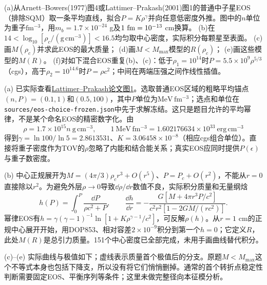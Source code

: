\begin{exercise}
(a)从Arnett--Bowers(1977)图4或Lattimer--Prakash(2001)图1的普通中子星EOS（排除SQM）取一条平均直线，拟合$P=K\rho^\gamma$并向任意低密度外推。图中的$n$单位为重子$\mathrm{fm^{-3}}$，用$m_b=1.7\times10^{-24}$ g及$1\ {\rm fm}=10^{-13}$ cm换算。
(b)在$14<\log_{10}[\rho_c/(\mathrm{g\,cm^{-3}})]<16.5$均匀取中心密度，实际积分每颗星至表面。
(c)画$M(\rho_c)$并求此EOS的最大质量；
(d)画$M<M_{\max}$模型的$R(\rho_c)$；
(e)画这些模型的$M(R)$。
(f)对如下混合EOS重复(b)、(c)：低于$\rho_1=10^{14}$时$P=5.5\times10^9\rho^{5/3}$（cgs），高于$\rho_2=10^{14.6}$时$P=\rho c^2$；中间在两端压强之间作线性插值。
\end{exercise}
\begin{solution}
(a) 已实际查看\href{https://arxiv.org/abs/astro-ph/0002232}{Lattimer--Prakash论文图1}。选取普通EOS区域的粗略平均锚点$(n,P)=(0.1,1)$和$(0.5,100)$，其中$P$单位为$\mathrm{MeV\,fm^{-3}}$；选点和单位在\texttt{sources/eos-choice-frozen.json}中先于求解冻结。这只是题目允许的平均幂律，不是某个命名EOS的精密数字化。由
\[
 \rho=1.7\times10^{15}n\ \mathrm{g\,cm^{-3}},\qquad
 1\ \mathrm{MeV\,fm^{-3}}=1.602176634\times10^{33}\ \mathrm{erg\,cm^{-3}}
\]
得到$\gamma=\ln100/\ln5=2.8613531$、$K=3.06458\times10^{-8}$（相应cgs组合单位）。直接将重子密度作为TOV的$\rho$忽略了内能和结合能关系；真实EOS应同时提供$P(\epsilon)$与重子数密度。

(b) 中心正规展开为$M=(4\pi/3)\rho_c r^3+O(r^5)$、$P=P_c+O(r^2)$，不能从$r=0$直接除以$r^2$。为避免外层$\rho\to0$导致$\dd\rho/\dd r$数值不良，实际积分质量和无量纲焓
\[
 h(P)=\int_0^P\frac{\dd P}{\rho c^2+P},\qquad
 \frac{\dd h}{\dd r}
 =-\frac{G[M+4\pi r^3P/c^2]}
 {c^2r^2[1-2GM/(rc^2)]}.
\]
幂律EOS有$h=\gamma(\gamma-1)^{-1}\ln[1+K\rho^{\gamma-1}/c^2]$，可反解$\rho(h)$。从$r=1$ cm的正规中心展开开始，用DOP853、相对容差$2\times10^{-9}$积分到第一个$h=0$；它定义$R$，此处$M(R)$是总引力质量。151个中心密度已全部完成，未用手画曲线替代积分。

(c)--(e) 实际曲线与极值如下；虚线表示质量首个极值后的分支。原题$M<M_{\max}$这个不等式本身也包括下降支，所以没有将它们悄悄删掉。通常的首个转折点稳定性判断需要固定EOS、平衡序列等条件；这里未做完整径向本征模分析。
\begin{center}
\hfill
{}


\end{center}
\end{solution}
